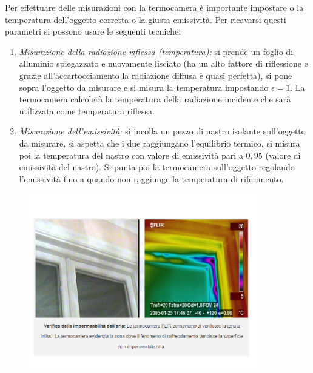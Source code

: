 Per effettuare delle misurazioni con la termocamera è importante impostare o la
temperatura dell'oggetto corretta o la giusta emissività. Per ricavarsi questi
parametri si possono usare le seguenti tecniche:

\begin{enumerate}
    \item \textit{Misurazione della radiazione riflessa (temperatura):} si prende
          un foglio di alluminio spiegazzato e nuovamente lisciato (ha un alto fattore di riflessione e
          grazie all'accartocciamento la radiazione diffusa è quasi perfetta), si pone
          sopra l'oggetto da misurare e si misura la temperatura impostando $\epsilon = 1$.
          La termocamera calcolerà la temperatura della radiazione incidente che sarà
          utilizzata come temperatura riflessa.
    \item \textit{Misurazione dell'emissività:} si incolla un pezzo di nastro
          isolante sull'oggetto da misurare, si aspetta che i due raggiungano l'equilibrio
          termico, si misura poi la temperatura del nastro con valore di emissività
          pari a $0,95$ (valore di emissività del nastro). Si punta poi la termocamera
          sull'oggetto regolando l'emissività fino a quando non raggiunge la temperatura
          di riferimento.
\end{enumerate}

\begin{figure}[H]
    \centering
    \includegraphics[width=10cm, keepaspectratio]{capitoli/immagini/imgs/termoesempio1.png}
\end{figure}

